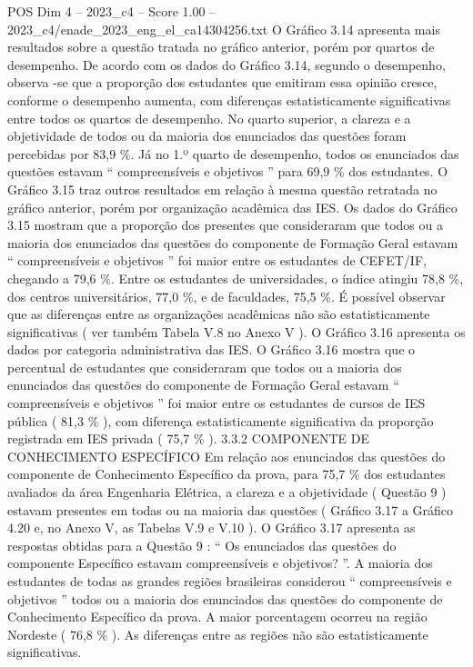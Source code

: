 \begin{textsample}{POS Dim 4 – 2023\_c4 – Score 1.00 – 2023\_c4/enade\_2023\_eng\_el\_ca14304256.txt}
O Gráfico 3.14 apresenta mais resultados sobre a questão tratada no gráfico anterior, porém por quartos de desempenho.
De acordo com os dados do Gráfico 3.14, segundo o desempenho, observa -se que a proporção dos estudantes que emitiram essa opinião cresce, conforme o desempenho aumenta, com diferenças estatisticamente significativas entre todos os quartos de desempenho.
No quarto superior, a clareza e a objetividade de todos ou da maioria dos enunciados das questões foram percebidas por 83,9 \%.
Já no 1.º quarto de desempenho, todos os enunciados das questões estavam “ compreensíveis e objetivos ” para 69,9 \% dos estudantes.
O Gráfico 3.15 traz outros resultados em relação à mesma questão retratada no gráfico anterior, porém por organização acadêmica das IES.
Os dados do Gráfico 3.15 mostram que a proporção dos presentes que consideraram que todos ou a maioria dos enunciados das questões do componente de Formação Geral estavam “ compreensíveis e objetivos ” foi maior entre os estudantes de CEFET/IF, chegando a 79,6 \%.
Entre os estudantes de universidades, o índice atingiu 78,8 \%, dos centros universitários, 77,0 \%, e de faculdades, 75,5 \%.
É possível observar que as diferenças entre as organizações acadêmicas não são estatisticamente significativas ( ver também Tabela V.8 no Anexo V ).
O Gráfico 3.16 apresenta os dados por categoria administrativa das IES.
O Gráfico 3.16 mostra que o percentual de estudantes que consideraram que todos ou a maioria dos enunciados das questões do componente de Formação Geral estavam “ compreensíveis e objetivos ” foi maior entre os estudantes de cursos de IES pública ( 81,3 \% ), com diferença estatisticamente significativa da proporção registrada em IES privada ( 75,7 \% ). 3.3.2 COMPONENTE DE CONHECIMENTO ESPECÍFICO Em relação aos enunciados das questões do componente de Conhecimento Específico da prova, para 75,7 \% dos estudantes avaliados da área Engenharia Elétrica, a clareza e a objetividade ( Questão 9 ) estavam presentes em todas ou na maioria das questões ( Gráfico 3.17 a Gráfico 4.20 e, no Anexo V, as Tabelas V.9 e V.10 ).
O Gráfico 3.17 apresenta as respostas obtidas para a Questão 9 : “ Os enunciados das questões do componente Específico estavam compreensíveis e objetivos? ”.
A maioria dos estudantes de todas as grandes regiões brasileiras considerou “ compreensíveis e objetivos ” todos ou a maioria dos enunciados das questões do componente de Conhecimento Específico da prova.
A maior porcentagem ocorreu na região Nordeste ( 76,8 \% ).
As diferenças entre as regiões não são estatisticamente significativas.

\end{textsample}
